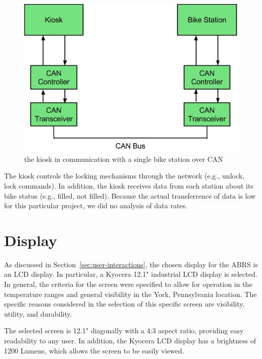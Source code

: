 \documentclass[11pt,a4paper,onesides]{report}
\begin{document}
\begin{figure}[h]
	\begin{center}
		\includegraphics[scale = 0.6]{can-bus-diagram}
	\end{center}
	\label{fig:can-bus-diagram}
\caption{the kiosk in communication with a single bike station over CAN}
\end{figure}

The kiosk controls the locking mechanisms through the network (e.g., unlock, lock commands).  In addition, the kiosk receives data from each station about its bike status (e.g., filled, not filled).  Because the actual transferrence of data is low for this particular project, we did no analysis of data rates.

\section {Display}

     As discussed in Section~\ref{sec:user-interactions}, the chosen display for the ABRS is an LCD display.  In particular, a Kyocera 12.1" industrial LCD display is selected.  In general, the criteria for the screen were specified to allow for operation in the temperature ranges and general visibility in the York, Pennsylvania location.  The specific reasons considered in the selection of this specific screen are visibility, utility, and durability.  

    The selected screen is 12.1" diagonally with a 4:3 aspect ratio, providing easy readability to any user.  In addition, the Kyocera LCD display has a brightness of 1200 Lumens, which allows the screen to be easily viewed.  
\end{document}
